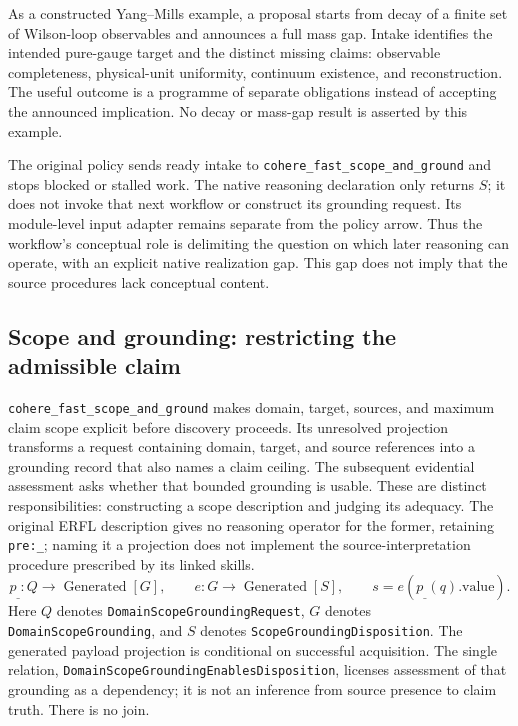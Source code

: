 As a constructed Yang--Mills example, a proposal starts from decay of a finite set of Wilson-loop observables and announces a full mass gap. Intake identifies the intended pure-gauge target and the distinct missing claims: observable completeness, physical-unit uniformity, continuum existence, and reconstruction. The useful outcome is a programme of separate obligations instead of accepting the announced implication. No decay or mass-gap result is asserted by this example.

The original policy sends ready intake to \texttt{cohere\_fast\_scope\_and\_ground} and stops blocked or stalled work. The native reasoning declaration only returns $S$; it does not invoke that next workflow or construct its grounding request. Its module-level input adapter remains separate from the policy arrow. Thus the workflow's conceptual role is delimiting the question on which later reasoning can operate, with an explicit native realization gap. This gap does not imply that the source procedures lack conceptual content.



\subsection{Scope and grounding: restricting the admissible claim}
\label{app:granular-cohere_fast_scope_and_ground}
\texttt{cohere\_fast\_scope\_and\_ground} makes domain, target, sources, and maximum claim scope explicit before discovery proceeds. Its unresolved projection transforms a request containing domain, target, and source references into a grounding record that also names a claim ceiling. The subsequent evidential assessment asks whether that bounded grounding is usable. These are distinct responsibilities: constructing a scope description and judging its adequacy. The original ERFL description gives no reasoning operator for the former, retaining \texttt{pre:\_}; naming it a projection does not implement the source-interpretation procedure prescribed by its linked skills.
\[
 p_{\_}:Q\to\operatorname{Generated}[G],\qquad
 e:G\to\operatorname{Generated}[S],\qquad s=e(p_{\_}(q).\mathrm{value}).
\]
Here $Q$ denotes \texttt{Domain\allowbreak Scope\allowbreak Grounding\allowbreak Request}, $G$ denotes \texttt{Domain\allowbreak Scope\allowbreak Grounding}, and $S$ denotes \texttt{Scope\allowbreak Grounding\allowbreak Disposition}. The generated payload projection is conditional on successful acquisition. The single relation, \texttt{Domain\allowbreak Scope\allowbreak Grounding\allowbreak Enables\allowbreak Disposition}, licenses assessment of that grounding as a dependency; it is not an inference from source presence to claim truth. There is no join.

